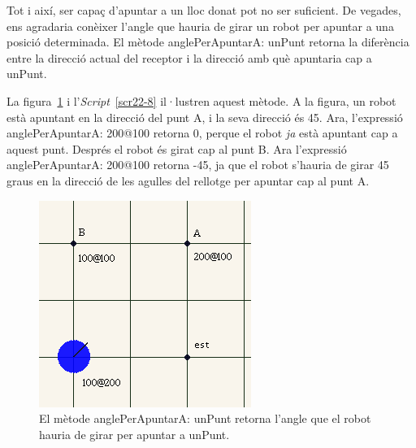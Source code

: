 
Tot i així, ser capaç d'apuntar a un lloc donat pot no ser suficient. De vegades, ens agradaria conèixer l'angle que hauria de girar un robot per apuntar a una posició determinada. El mètode \textsf{anglePerApuntarA: unPunt} retorna la diferència entre la direcció actual del receptor i la direcció amb què apuntaria cap a \textsf{unPunt}.

La figura~\ref{fig2203} i l'\emph{Script}~\ref{scr22-8} il·lustren aquest mètode. A la figura, un robot està apuntant en la direcció del punt A, i la seva direcció és 45. Ara, l'expressió \textsf{anglePerApuntarA: 200@100} retorna \textsf{0}, perque el robot \emph{ja} està apuntant cap a aquest punt. Després el robot és girat cap al punt B. Ara l'expressió \textsf{anglePerApuntarA: 200@100} retorna -45, ja que el robot s'hauria de girar 45 graus en la direcció de les agulles del rellotge per apuntar cap al punt A.
\begin{figure}[h!]
\begin{center}
\includegraphics[scale=0.5]{Imatges/figura22-3}
\end{center}
\caption{El mètode \textsf{\upshape anglePerApuntarA: unPunt} retorna l'angle que el robot hauria de girar per apuntar a \textsf{\upshape unPunt}.}
\label{fig2203}
\end{figure}

